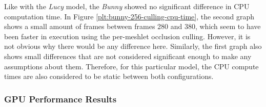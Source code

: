\noindent
Like with the \emph{Lucy} model, the \emph{Bunny} showed no significant difference in \ac{CPU} computation time. 
In Figure \ref{plt:bunny-256-culling-cpu-time}, the second graph shows a small amount of frames between frames 280 
and 380, which seem to have been faster in execution using the per-meshlet occlusion culling. However, it is not 
obvious why there would be any difference here. Similarly, the first graph also shows small differences that are 
not considered significant enough to make any assumptions about them. Therefore, for this particular model, the 
\ac{CPU} compute times are also considered to be static between both configurations.

\subsubsection*{GPU Performance Results} \label{subsubsec-gpu-performance-results-bunny}

